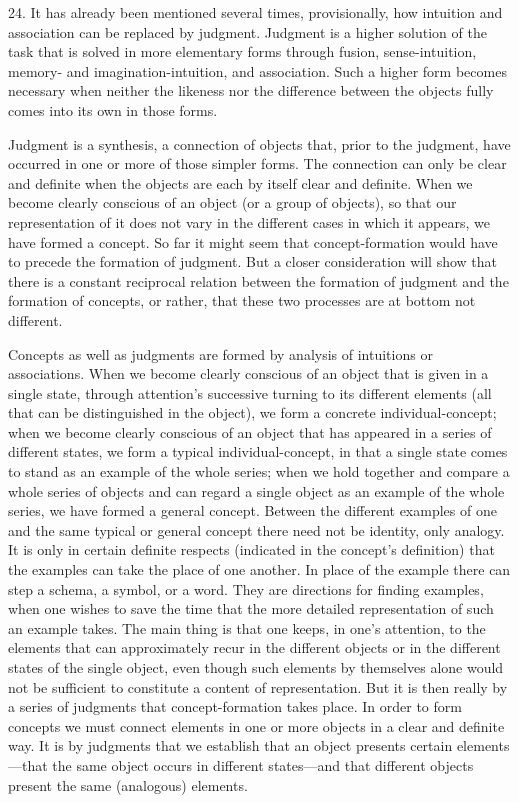 \documentclass[12pt,a4paper]{book}
\newcommand{\opage}[1]{\marginnote{\footnotesize\textit{[#1]}}}
\begin{document}
\opage{71}24. It has already been mentioned several times, provisionally, how
intuition and association can be replaced by judgment. Judgment is a
higher solution of the task that is solved in more elementary forms
through fusion, sense-intuition, memory- and imagination-intuition, and
association. Such a higher form becomes necessary when neither the
likeness nor the difference between the objects fully comes into its own
in those forms.

Judgment is a synthesis, a connection of objects that, prior to the
judgment, have occurred in one or more of those simpler forms. The
connection can only be clear and definite when the objects are each by
itself clear and definite. When we become clearly conscious of an object
(or a group of objects), so that our representation of it does not vary
in the different cases in which it appears, we have formed a concept. So
far it might seem that concept-formation would have to precede the
formation of judgment. But a closer consideration will show that there is
a constant reciprocal relation between the formation of judgment and the
formation of concepts, or rather, that these two processes are at bottom
not different.

Concepts as well as judgments are formed by analysis of intuitions or
associations. When we become clearly conscious of an object that is given
in a single state, through attention's successive turning to its
different elements (all that can be distinguished in the object), we form
a concrete individual-concept; when we become clearly conscious of an
object that has appeared in a series of different states, we form a
typical individual-concept, in that a single state comes to stand as an
example of the whole series; when we hold together and compare a whole
series of objects and can regard a single object as an example of the
whole series, we have formed a general concept. Between the different
\opage{72}examples of one and the same typical or general concept there need not be
identity, only analogy. It is only in certain definite respects
(indicated in the concept's definition) that the examples can take the
place of one another. In place of the example there can step a schema, a
symbol, or a word. They are directions for finding examples, when one
wishes to save the time that the more detailed representation of such an
example takes. The main thing is that one keeps, in one's attention, to
the elements that can approximately recur in the different objects or in
the different states of the single object, even though such elements by
themselves alone would not be sufficient to constitute a content of
representation. But it is then really by a series of judgments that
concept-formation takes place. In order to form concepts we must connect
elements in one or more objects in a clear and definite way. It is by
judgments that we establish that an object presents certain elements---that
the same object occurs in different states---and that different objects
present the same (analogous) elements.
\end{document}
